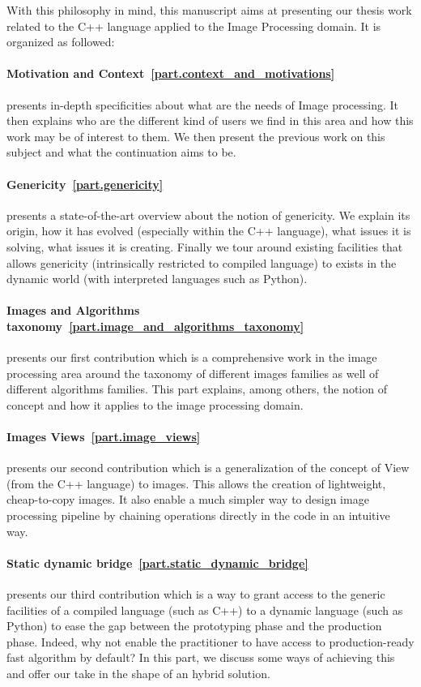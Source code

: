 With this philosophy in mind, this manuscript aims at presenting our thesis work related to the C++ language applied to
the Image Processing domain. It is organized as followed:

\paragraph{Motivation and Context~\ref{part.context_and_motivations}} presents in-depth specificities about what are the
needs of Image processing. It then explains who are the different kind of users we find in this area and how this work
may be of interest to them. We then present the previous work on this subject and what the continuation aims to be.

\paragraph{Genericity~\ref{part.genericity}} presents a state-of-the-art overview about the notion of genericity. We
explain its origin, how it has evolved (especially within the C++ language), what issues it is solving, what issues it
is creating. Finally we tour around existing facilities that allows genericity (intrinsically restricted to compiled
language) to exists in the dynamic world (with interpreted languages such as Python).

\paragraph{Images and Algorithms taxonomy~\ref{part.image_and_algorithms_taxonomy}} presents our first contribution
which is a comprehensive work in the image processing area around the taxonomy of different images families as well of
different algorithms families. This part explains, among others, the notion of concept and how it applies to the
image processing domain.

\paragraph{Images Views~\ref{part.image_views}} presents our second contribution which is a generalization of the
concept of View (from the C++ language) to images. This allows the creation of lightweight, cheap-to-copy images. It
also enable a much simpler way to design image processing pipeline by chaining operations directly in the code in an
intuitive way.

\paragraph{Static dynamic bridge~\ref{part.static_dynamic_bridge}} presents our third contribution which is a way to
grant access to the generic facilities of a compiled language (such as C++) to a dynamic language (such as Python) to
ease the gap between the prototyping phase and the production phase. Indeed, why not enable the practitioner to have
access to production-ready fast algorithm by default? In this part, we discuss some ways of achieving this and offer our
take in the shape of an hybrid solution.
